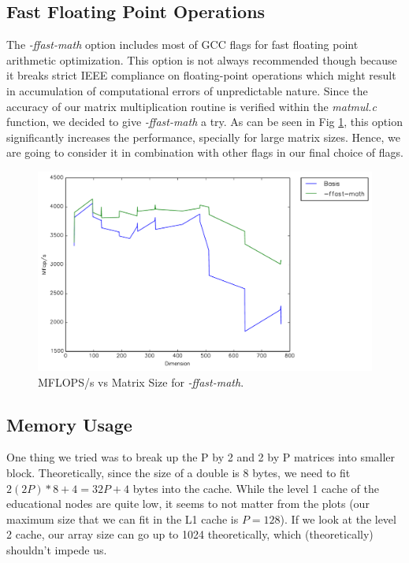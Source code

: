 \documentclass{article}
\begin{document}
\subsection{Fast Floating Point Operations}

The \textit{-ffast-math} option includes most of GCC flags for fast floating point arithmetic optimization.  This option is not always recommended though because it breaks strict IEEE compliance on floating-point operations which might result in accumulation of computational errors of unpredictable nature. Since the accuracy of our matrix multiplication routine is verified within the \textit{ matmul.c} function, we decided to give \textit{-ffast-math} a try. As can be seen in Fig \ref{fig:timing-math}, this option significantly increases the performance, specially for large matrix sizes. Hence, we are going to consider it in combination with other flags in our final choice of flags.

  \begin{figure}[h]
    \centering
    \includegraphics[width=.7\textwidth]{timing-math.pdf}
    \caption{MFLOPS/s vs Matrix Size for \textit{-ffast-math}.}
    \label{fig:timing-math}
  \end{figure}

    \subsection{Memory Usage}

    One thing we tried was to break up the P by 2 and 2 by P matrices into smaller block. Theoretically, since the size of a double is 8 bytes, we need to fit
    $2(2P)*8 + 4 = 32P + 4$ bytes into the cache. While the level 1 cache of the educational nodes are quite low, it seems to not matter from the plots (our maximum
    size that we can fit in the L1 cache is $P=128$). If we look at the level 2 cache, our array size can go up to 1024 theoretically, which (theoretically) shouldn't
    impede us.
\end{document}
